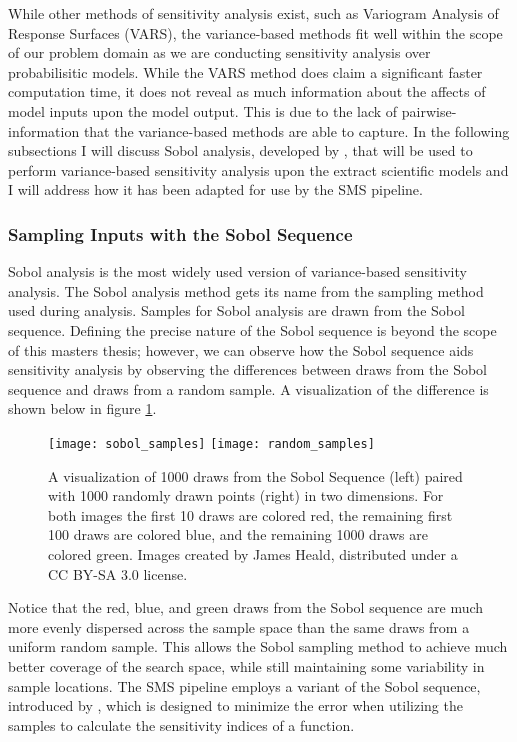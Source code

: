 While other methods of sensitivity analysis exist, such as Variogram Analysis of Response Surfaces (VARS), the variance-based methods fit well within the scope of our problem domain as we are conducting sensitivity analysis over probabilisitic models.
While the VARS method does claim a significant faster computation time, it does not reveal as much information about the affects of model inputs upon the model output.
This is due to the lack of pairwise-information that the variance-based methods are able to capture.
In the following subsections I will discuss Sobol analysis, developed by \citet{sobol2001globalSA}, that will be used to perform variance-based sensitivity analysis upon the extract scientific models and I will address how it has been adapted for use by the SMS pipeline.

\subsubsection{Sampling Inputs with the Sobol Sequence\label{sec:sobol_seq}}
Sobol analysis is the most widely used version of variance-based sensitivity analysis. The Sobol analysis method gets its name from the sampling method used during analysis. Samples for Sobol analysis are drawn from the Sobol sequence. Defining the precise nature of the Sobol sequence is beyond the scope of this masters thesis; however, we can observe how the Sobol sequence aids sensitivity analysis by observing the differences between draws from the Sobol sequence and draws from a random sample. A visualization of the difference is shown below in figure \ref{fig:sobol_seq_vis}.

\FloatBarrier
\begin{figure}[!htbp]
    \label{fig:sobol_seq_vis}
    \centering
    \texttt{[image: sobol\_samples]}\hfill
    \texttt{[image: random\_samples]}
    \caption[Sobol Sequence Visualization]{A visualization of 1000 draws from the Sobol Sequence (left) paired with 1000 randomly drawn points (right) in two dimensions. For both images the first 10 draws are colored red, the remaining first 100 draws are colored blue, and the remaining 1000 draws are colored green. Images created by James Heald, distributed under a CC BY-SA 3.0 license.}
\end{figure}
\FloatBarrier

Notice that the red, blue, and green draws from the Sobol sequence are much more evenly dispersed across the sample space than the same draws from a uniform random sample. This allows the Sobol sampling method to achieve much better coverage of the search space, while still maintaining some variability in sample locations. The SMS pipeline employs a variant of the Sobol sequence, introduced by \citet{saltelli2002ImprovedSobolSeq}, which is designed to minimize the error when utilizing the samples to calculate the sensitivity indices of a function.

